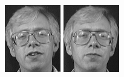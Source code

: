\begin{figure}[ht]
 \includegraphics[width=\columnwidth/11]{ch3/figures/s2_1.png}
 \includegraphics[width=\columnwidth/11]{ch3/figures/s2_2.png}

\end{figure}
